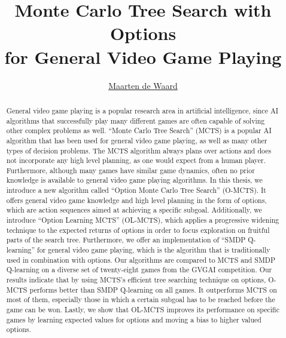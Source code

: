 \documentclass[a4]{report}
\title{Monte Carlo Tree Search with Options\\for General Video Game Playing}
\author{\href{mailto:mrtndwrd@gmail.com}{Maarten de Waard}}
\begin{document}

\maketitle

\begin{abstract}
	General video game playing is a popular research area in artificial
	intelligence, since AI algorithms that successfully play many different
	games are often capable of solving other complex problems as well.  ``Monte
	Carlo Tree Search'' (MCTS) is a popular AI algorithm that has been used for
	general video game playing, as well as many other types of decision
	problems.  The MCTS algorithm always plans over actions and does not
	incorporate any high level planning, as one would expect from a human
	player. Furthermore, although many games have similar game dynamics, often
	no prior knowledge is available to general video game playing algorithms.
	In this thesis, we introduce a new algorithm called ``Option Monte Carlo
	Tree Search'' (O-MCTS). It offers general video game knowledge and high
	level planning in the form of options, which are action sequences aimed at
	achieving a specific subgoal. Additionally, we introduce ``Option Learning
	MCTS'' (OL-MCTS), which applies a progressive widening technique to the
	expected returns of options in order to focus exploration on fruitful parts
	of the search tree. Furthermore, we offer an implementation of ``SMDP
	Q-learning'' for general video game playing, which is the algorithm
	that is traditionally used in combination with options. Our algorithms
	are compared to MCTS and SMDP Q-learning on a diverse set of twenty-eight
	games from the GVGAI competition. Our results indicate that by using MCTS's
	efficient tree searching technique on options, O-MCTS performs better than
	SMDP Q-learning on all games. It outperforms MCTS on most of them,
	especially those in which a certain subgoal has to be reached before the
	game can be won.  Lastly, we show that OL-MCTS improves its performance on
	specific games by learning expected values for options and moving a bias to
	higher valued options.  \end{abstract}

\tableofcontents






\end{document}
